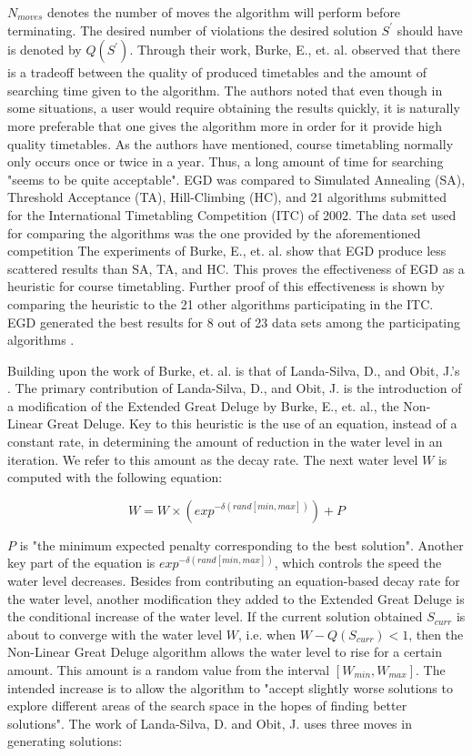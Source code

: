 $N_{moves}$ denotes the number of moves the algorithm will perform before terminating. The desired number of violations the desired solution $S^{'}$ should have is denoted by $Q(S^{'})$. Through their work, Burke, E., et. al. observed that there is a tradeoff between the quality of produced timetables and the amount of searching time given to the algorithm. The authors noted that even though in some situations, a user would require obtaining the results quickly, it is naturally more preferable that one gives the algorithm more in order for it provide high quality timetables. As the authors have mentioned, course timetabling normally only occurs once or twice in a year. Thus, a long amount of time for searching "seems to be quite acceptable". EGD was compared to Simulated Annealing (SA), Threshold Acceptance (TA), Hill-Climbing (HC), and 21 algorithms submitted for the International Timetabling Competition (ITC) of 2002. The data set used for comparing the algorithms was the one provided by the aforementioned competition The experiments of Burke, E., et. al. show that EGD produce less scattered results than SA, TA, and HC. This proves the effectiveness of EGD as a heuristic for course timetabling. Further proof of this effectiveness is shown by comparing the heuristic to the 21 other algorithms participating in the ITC. EGD generated the best results for 8 out of 23 data sets among the participating algorithms \cite{gd-burke}.

Building upon the work of Burke, et. al. is that of Landa-Silva, D., and Obit, J.'s \cite{nlgd-landa-silva}. The primary contribution of Landa-Silva, D., and Obit, J. is the introduction of a modification of the Extended Great Deluge by Burke, E., et. al., the Non-Linear Great Deluge. Key to this heuristic is the use of an equation, instead of a constant rate, in determining the amount of reduction in the water level in an iteration. We refer to this amount as the decay rate. The next water level $W$ is computed with the following equation:

\[
	W = W \times (exp^{-\delta(rand[min, max])}) + P	
\]

$P$ is "the minimum expected penalty corresponding to the best solution". Another key part of the equation is $exp^{-\delta(rand[min, max])}$, which controls the speed the water level decreases. Besides from contributing an equation-based decay rate for the water level, another modification they added to the Extended Great Deluge is the conditional increase of the water level. If the current solution obtained $S_{curr}$ is about to converge with the water level $W$, i.e. when $W - Q(S_{curr}) < 1$, then the Non-Linear Great Deluge algorithm allows the water level to rise for a certain amount. This amount is a random value from the interval $[W_{min}, W_{max}]$. The intended increase is to allow the algorithm to "accept slightly worse solutions to explore different areas of the search space in the hopes of finding better solutions". The work of Landa-Silva, D. and Obit, J. uses three moves in generating solutions:

